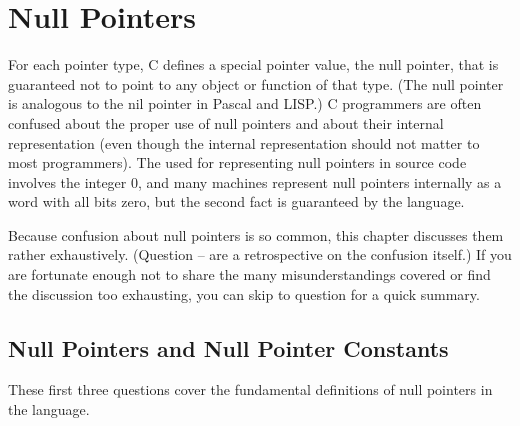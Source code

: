 \chapter{Null Pointers}	\label{chap:nullptr}

For each pointer type, C defines a special pointer value, the null pointer,
that is guaranteed not to point to any object or function of that type. (The
null pointer is analogous to the nil pointer in Pascal and LISP.)
C programmers are often confused about the proper use of null pointers and
about their internal representation (even though the internal representation
should not matter to most programmers). The  used for
representing null pointers in source code involves the integer 0, and many
machines represent null pointers internally as a word with all bits zero, but
the second fact is  guaranteed by the language.

Because confusion about null pointers is so common, this chapter discusses them
rather exhaustively. (Question -- are a retrospective on the confusion
itself.) If you are fortunate enough not to share the many misunderstandings
covered or find the discussion too exhausting, you can skip to question 
for a quick summary.

\section{Null Pointers and Null Pointer Constants}
These first three questions cover the fundamental definitions of null pointers
in the language.

